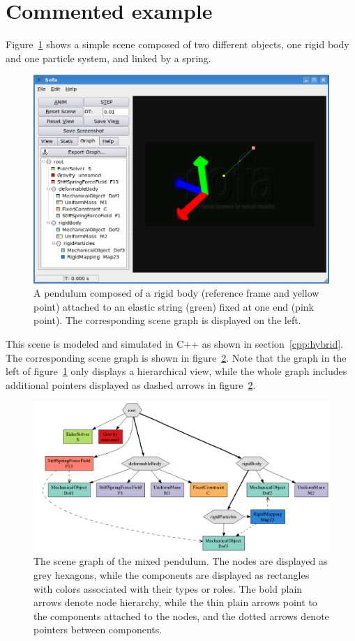 \section{Commented example} \label{sec:commentedExample}
Figure~\ref{fig:mixedPendulum} shows a simple scene composed of two different objects, one rigid body and one particle system, and linked by a spring.
\begin{figure}
 \centering
 \includegraphics[width=0.9\linewidth]{mixedPendulum.png}
 \caption{A pendulum composed of a rigid body (reference frame and yellow point) attached to an elastic string (green) fixed at one end (pink point). 
 The corresponding scene graph is displayed on the left.}
 \label{fig:mixedPendulum}
\end{figure}
This scene is modeled and simulated in C++ as shown in section~\ref{cpp:hybrid}. 
The corresponding scene graph is shown in figure~\ref{fig:mixedPendulum-graph}. 
Note that the graph in the left of figure~\ref{fig:mixedPendulum} only displays a hierarchical view, while the whole graph includes additional pointers displayed as dashed arrows in figure~\ref{fig:mixedPendulum-graph}.
\begin{figure}
 \centering
 \includegraphics[width=\linewidth]{mixedPendulum-graph}
 \caption{The scene graph of the mixed pendulum. 
 The nodes are displayed as grey hexagons, while the components are displayed as rectangles with colors associated with their types or roles. 
 The bold plain arrows denote node hierarchy, while the thin plain arrows point to the components attached to the nodes, and the dotted arrows denote pointers between components.}
 \label{fig:mixedPendulum-graph}
\end{figure}


